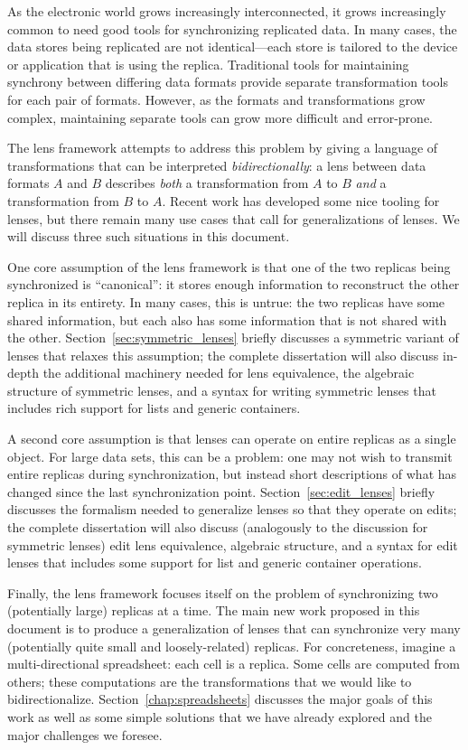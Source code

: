 As the electronic world grows increasingly interconnected, it grows
increasingly common to need good tools for synchronizing replicated data. In
many cases, the data stores being replicated are not identical---each store
is tailored to the device or application that is using the replica.
Traditional tools for maintaining synchrony between differing data formats
provide separate transformation tools for each pair of formats. However, as
the formats and transformations grow complex, maintaining separate tools can
grow more difficult and error-prone.

The lens framework attempts to address this problem by giving a language of
transformations that can be interpreted \emph{bidirectionally}: a lens
between data formats $A$ and $B$ describes \emph{both} a transformation from
$A$ to $B$ \emph{and} a transformation from $B$ to $A$. Recent work has
developed some nice tooling for lenses, but there remain many use cases that
call for generalizations of lenses. We will discuss three such situations in
this document.

One core assumption of the lens framework is that one of the two replicas
being synchronized is ``canonical'': it stores enough information to
reconstruct the other replica in its entirety. In many cases, this is
untrue: the two replicas have some shared information, but each also has
some information that is not shared with the other.
Section~\ref{sec:symmetric_lenses} briefly discusses a symmetric variant of
lenses that relaxes this assumption; the complete dissertation will also
discuss in-depth the additional machinery needed for lens equivalence, the
algebraic structure of symmetric lenses, and a syntax for writing symmetric
lenses that includes rich support for lists and generic containers.

A second core assumption is that lenses can operate on entire replicas as a
single object. For large data sets, this can be a problem: one may not wish
to transmit entire replicas during synchronization, but instead short
descriptions of what has changed since the last synchronization point.
Section~\ref{sec:edit_lenses} briefly discusses the formalism needed to
generalize lenses so that they operate on edits; the complete dissertation
will also discuss (analogously to the discussion for symmetric lenses) edit
lens equivalence, algebraic structure, and a syntax for edit lenses that
includes some support for list and generic container operations.

Finally, the lens framework focuses itself on the problem of synchronizing
two (potentially large) replicas at a time. The main new work proposed in
this document is to produce a generalization of lenses that can synchronize
very many (potentially quite small and loosely-related) replicas. For
concreteness, imagine a multi-directional spreadsheet: each cell is a
replica. Some cells are computed from others; these computations are the
transformations that we would like to bidirectionalize.
Section~\ref{chap:spreadsheets} discusses the major goals of this work as
well as some simple solutions that we have already explored and the major
challenges we foresee.


